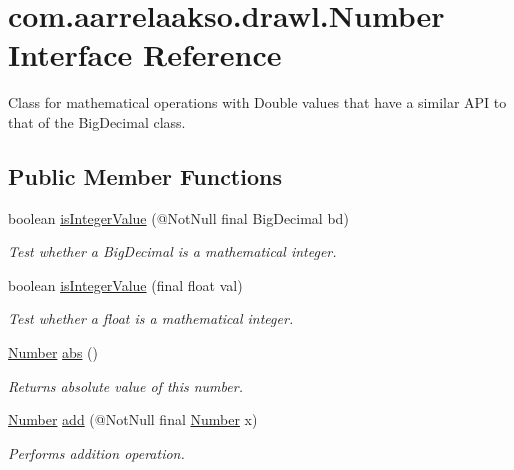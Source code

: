 \hypertarget{interfacecom_1_1aarrelaakso_1_1drawl_1_1_number}{}\section{com.\+aarrelaakso.\+drawl.\+Number Interface Reference}
\label{interfacecom_1_1aarrelaakso_1_1drawl_1_1_number}


Class for mathematical operations with Double values that have a similar A\+PI to that of the Big\+Decimal class.  


\subsection*{Public Member Functions}
\begin{DoxyCompactItemize}
\item 
boolean \hyperlink{interfacecom_1_1aarrelaakso_1_1drawl_1_1_number_a5bba650d5d9651e83c4ff4364d6f6abc}{is\+Integer\+Value} (@Not\+Null final Big\+Decimal bd)
\begin{DoxyCompactList}\small\item\em Test whether a Big\+Decimal is a mathematical integer. \end{DoxyCompactList}\item 
boolean \hyperlink{interfacecom_1_1aarrelaakso_1_1drawl_1_1_number_a731dbb91dcfd46319662f57c26fcf06a}{is\+Integer\+Value} (final float val)
\begin{DoxyCompactList}\small\item\em Test whether a float is a mathematical integer. \end{DoxyCompactList}\item 
\hyperlink{interfacecom_1_1aarrelaakso_1_1drawl_1_1_number}{Number} \hyperlink{interfacecom_1_1aarrelaakso_1_1drawl_1_1_number_a62af4c1c24c3f9c70dabfe3318e53ac3}{abs} ()
\begin{DoxyCompactList}\small\item\em Returns absolute value of this number. \end{DoxyCompactList}\item 
\hyperlink{interfacecom_1_1aarrelaakso_1_1drawl_1_1_number}{Number} \hyperlink{interfacecom_1_1aarrelaakso_1_1drawl_1_1_number_a05193401712bbba333a586751633c5f6}{add} (@Not\+Null final \hyperlink{interfacecom_1_1aarrelaakso_1_1drawl_1_1_number}{Number} x)
\begin{DoxyCompactList}\small\item\em Performs addition operation. \end{DoxyCompactList}\item 

\end{DoxyCompactItemize}

